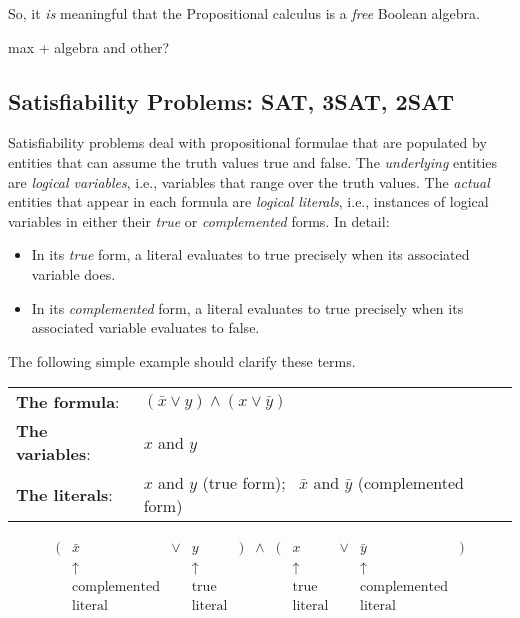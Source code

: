 So, it {\em is} meaningful that the Propositional calculus is a {\em
  free} Boolean algebra.
  
  {\Denis max + algebra and other?}


\subsection{Satisfiability Problems: {\sf SAT}, {\sf 3SAT}, {\sf 2SAT}}
\label{sec:Satisfiability}

Satisfiability problems deal with propositional formulae that are
populated by entities that can assume the truth values {\small\sf
  true} and {\sc false}. 
The {\em underlying} entities are {\it logical variables},
i.e., variables that range over the truth values.  The {\em actual}
entities that appear in each formula are {\it logical literals}, 
i.e., instances of logical variables in either their {\em true} or
{\em complemented} forms.
In detail:
\begin{itemize}
\item
In its {\em true} form, a literal evaluates to {\sc true}
precisely when its associated variable does.
\item
In its {\em complemented} form, a literal evaluates to {\small\sf
  true} precisely when its associated variable evaluates to {\small\sf
  false}.
\end{itemize}
The following simple example should clarify these terms.

\begin{tabular}{ll}
{\bf The formula}:  & $(\bar{x} \vee y) \wedge (x \vee \bar{y})$ \\
{\bf The variables}: & $x$ and $y$ \\
{\bf The literals}:  & $x$ and $y$ (true form); \ $\bar{x}$ and $\bar{y}$
(complemented form)
\end{tabular}
\[
\begin{array}{ccccccccccc}
( & \bar{x} & \vee & y & ) & \wedge & ( & x & \vee & \bar{y} & ) \\
  & \uparrow &     & \uparrow & & & & \uparrow & & \uparrow & \\
  & \mbox{complemented} &  & \mbox{true}  & & & & \mbox{true} &
        & \mbox{complemented} &  \\
  & \mbox{literal} & & \mbox{literal} & & & & \mbox{literal} & &
  \mbox{literal} & 
\end{array}
\]

